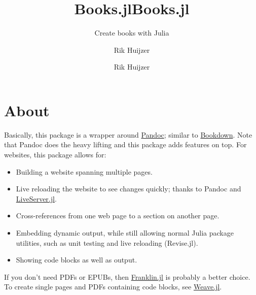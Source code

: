 \documentclass[
  14pt
  american,
  paper=a4,
  ,captions=tableheading
]{scrreprt}
\title{Books.jl}
\subtitle{Create books with Julia}
\author{Rik Huijzer}
\date{}
\title{Books.jl}
\author{Rik Huijzer}
\date{}
\providecommand{\tightlist}{%
  \setlength{\itemsep}{0pt}\setlength{\parskip}{0pt}}
\begin{document}
\begin{titlepage}
\newcommand{\colorRule}[3][black]{\textcolor[HTML]{#1}{\rule{#2}{#3}}}
\end{titlepage}
\restoregeometry




{
\setcounter{tocdepth}{2}
\tableofcontents
}
\hypertarget{sec:about}{%
\chapter{About}\label{sec:about}}

Basically, this package is a wrapper around
\href{https://pandoc.org/}{Pandoc}; similar to
\href{https://bookdown.org}{Bookdown}. Note that Pandoc does the heavy
lifting and this package adds features on top. For websites, this
package allows for:

\begin{itemize}
\tightlist
\item
  Building a website spanning multiple pages.
\item
  Live reloading the website to see changes quickly; thanks to Pandoc
  and \href{https://github.com/tlienart/LiveServer.jl}{LiveServer.jl}.
\item
  Cross-references from one web page to a section on another page.
\item
  Embedding dynamic output, while still allowing normal Julia package
  utilities, such as unit testing and live reloading (Revise.jl).
\item
  Showing code blocks as well as output.
\end{itemize}

If you don't need PDFs or EPUBs, then
\href{https://github.com/tlienart/Franklin.jl}{Franklin.jl} is probably
a better choice. To create single pages and PDFs containing code blocks,
see \href{https://github.com/JunoLab/Weave.jl}{Weave.jl}.
\end{document}
